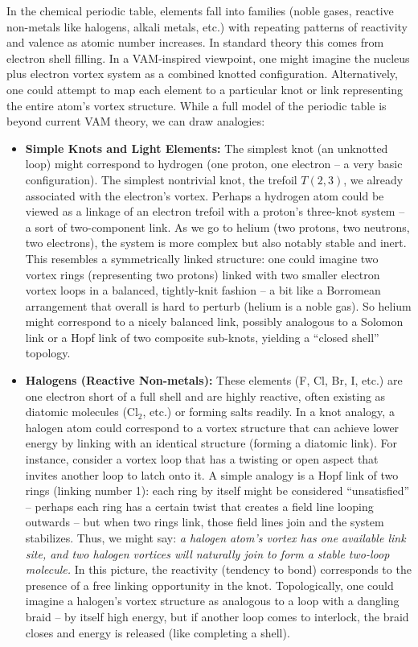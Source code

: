 \documentclass[a4paper,12pt]{article}
\begin{document}
        In the chemical periodic table, elements fall into families (noble gases, reactive non-metals like halogens, alkali metals, etc.) with repeating patterns of reactivity and valence as atomic number increases. In standard theory this comes from electron shell filling. In a VAM-inspired viewpoint, one might imagine the nucleus plus electron vortex system as a combined knotted configuration. Alternatively, one could attempt to map each element to a particular knot or link representing the entire atom's vortex structure. While a full model of the periodic table is beyond current VAM theory, we can draw analogies:
        
        \begin{itemize}
            \item \textbf{Simple Knots and Light Elements:} The simplest knot (an unknotted loop) might correspond to hydrogen (one proton, one electron -- a very basic configuration). The simplest nontrivial knot, the trefoil $T(2,3)$, we already associated with the electron's vortex. Perhaps a hydrogen atom could be viewed as a linkage of an electron trefoil with a proton's three-knot system -- a sort of two-component link. As we go to helium (two protons, two neutrons, two electrons), the system is more complex but also notably stable and inert. This resembles a symmetrically linked structure: one could imagine two vortex rings (representing two protons) linked with two smaller electron vortex loops in a balanced, tightly-knit fashion -- a bit like a Borromean arrangement that overall is hard to perturb (helium is a noble gas). So helium might correspond to a nicely balanced link, possibly analogous to a Solomon link or a Hopf link of two composite sub-knots, yielding a ``closed shell'' topology.
        
            \item \textbf{Halogens (Reactive Non-metals):} These elements (F, Cl, Br, I, etc.) are one electron short of a full shell and are highly reactive, often existing as diatomic molecules (Cl$_2$, etc.) or forming salts readily. In a knot analogy, a halogen atom could correspond to a vortex structure that can achieve lower energy by linking with an identical structure (forming a diatomic link). For instance, consider a vortex loop that has a twisting or open aspect that invites another loop to latch onto it. A simple analogy is a Hopf link of two rings (linking number 1): each ring by itself might be considered ``unsatisfied'' -- perhaps each ring has a certain twist that creates a field line looping outwards -- but when two rings link, those field lines join and the system stabilizes. Thus, we might say: \textit{a halogen atom's vortex has one available link site, and two halogen vortices will naturally join to form a stable two-loop molecule.} In this picture, the reactivity (tendency to bond) corresponds to the presence of a free linking opportunity in the knot. Topologically, one could imagine a halogen's vortex structure as analogous to a loop with a dangling braid -- by itself high energy, but if another loop comes to interlock, the braid closes and energy is released (like completing a shell).


\end{itemize}
\end{document}
